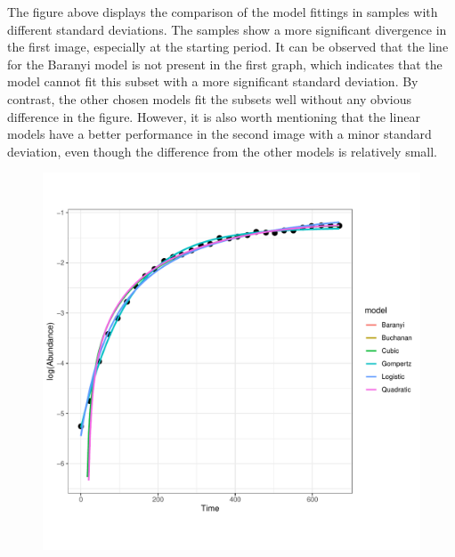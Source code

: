 \documentclass[11pt, oneside]{article}
\begin{document}
		\noindent The figure above displays the comparison of the model fittings in samples with different standard deviations. The samples show a more significant divergence in the first image, especially at the starting period. It can be observed that the line for the Baranyi model is not present in the first graph, which indicates that the model cannot fit this subset with a more significant standard deviation. By contrast, the other chosen models fit the subsets well without any obvious difference in the figure. However, it is also worth mentioning that the linear models have a better performance in the second image with a minor standard deviation, even though the difference from the other models is relatively small.
		
		\begin{figure}[H]
			\begin{center}
			\begin{minipage}{.5\textwidth}
				\centering
				\includegraphics[page=178, scale = 0.5]{plot_subsets.pdf}
			\end{minipage}%
			\begin{minipage}{.5\textwidth}
				\centering

\end{minipage}
\end{center}
\end{figure}
\end{document}
